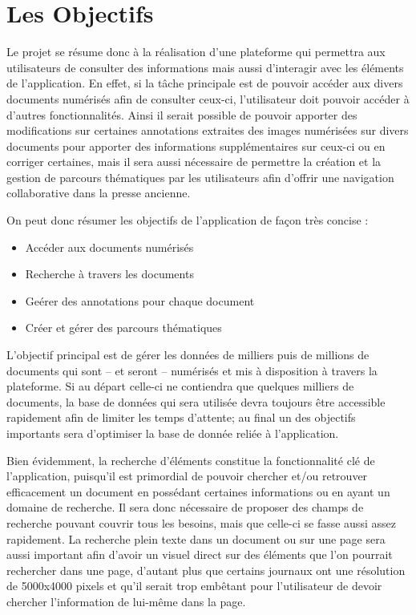 \section{Les Objectifs}
	\label{sec:objectifs}

    Le projet se résume donc à la réalisation d’une plateforme qui permettra aux utilisateurs
    de consulter des informations mais aussi d’interagir avec les éléments de l’application.
    En effet, si la tâche principale est de pouvoir accéder aux divers documents numérisés afin
    de consulter ceux-ci, l’utilisateur doit pouvoir accéder à d’autres fonctionnalités.
    Ainsi il serait possible de pouvoir apporter des modifications sur certaines annotations
    extraites des images numérisées sur divers documents pour apporter des informations
    supplémentaires sur ceux-ci ou en corriger certaines, mais il sera aussi nécessaire
    de permettre la création et la gestion de parcours thématiques par les utilisateurs
    afin d’offrir une navigation collaborative dans la presse ancienne.

    On peut donc résumer les objectifs de l’application de façon très concise :

    \begin{itemize}
        \item{Accéder aux documents numérisés}
        \item{Recherche à travers les documents}
        \item{Geérer des annotations pour chaque document}
        \item{Créer et gérer des parcours thématiques}
    \end{itemize}

    L’objectif principal est de gérer les données de milliers puis de millions de documents
    qui sont – et seront – numérisés et mis à disposition à travers la plateforme.
    Si au départ celle-ci ne contiendra que quelques milliers de documents, la base de données
    qui sera utilisée devra toujours être accessible rapidement afin de limiter les temps d’attente;
    au final un des objectifs importants sera d’optimiser la base de donnée reliée à l’application.

    Bien évidemment, la recherche d’éléments constitue la fonctionnalité clé de l’application,
    puisqu’il est primordial de pouvoir chercher et/ou retrouver efficacement un document
    en possédant certaines informations ou en ayant un domaine de recherche. Il sera donc nécessaire
    de proposer des champs de recherche pouvant couvrir tous les besoins, mais que celle-ci
    se fasse aussi assez rapidement. La recherche plein texte dans un document ou sur une page
    sera aussi important afin d’avoir un visuel direct sur des éléments que l’on pourrait rechercher
    dans une page, d’autant plus que certains journaux ont une résolution de 5000x4000 pixels et
    qu’il serait trop embêtant pour l’utilisateur de devoir chercher l’information de lui-même dans la page.

